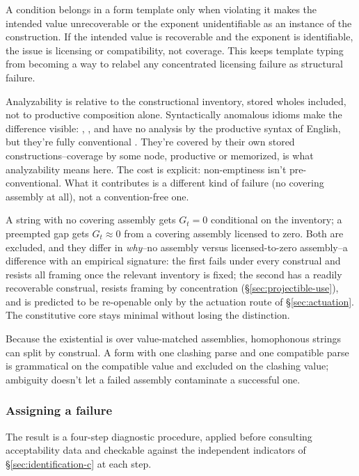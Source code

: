 A condition belongs in a form template only when violating it makes the intended
value unrecoverable or the exponent unidentifiable as an instance of the
construction. If the intended value is recoverable and the exponent is
identifiable, the issue is licensing or compatibility, not coverage. This keeps
template typing from becoming a way to relabel any concentrated licensing
failure as structural failure.

Analyzability is relative to the constructional inventory, stored wholes included, not to productive composition alone. Syntactically anomalous idioms make the difference visible: , , and  have no analysis by the productive syntax of English, but they're fully conventional \citep{fillmore1988}. They're covered by their own stored constructions--coverage by some node, productive or memorized, is what analyzability means here. The cost is explicit: non-emptiness isn't pre-conventional. What it contributes is a different kind of failure (no covering assembly at all), not a convention-free one.

A string with no covering assembly gets $G_t=0$ conditional on the inventory;
a preempted gap gets $G_t\approx0$ from a
covering assembly licensed to zero. Both are excluded, and they differ in
\emph{why}--no assembly versus licensed-to-zero assembly--a difference with an
empirical signature: the first fails under every construal and resists all
framing once the relevant inventory is fixed; the second has a readily recoverable
construal, resists framing by concentration (\S\ref{sec:projectible-use}), and
is predicted to be re-openable only by the actuation route of
\S\ref{sec:actuation}. The constitutive core stays minimal without losing the
distinction.

Because the existential is over value-matched assemblies, homophonous strings can split by construal. A form with one clashing parse and one compatible parse is grammatical on the compatible value and excluded on the clashing value; ambiguity doesn't let a failed assembly contaminate a successful one.

\subsubsection{Assigning a failure}
\label{sec:assigning-failure}
\label{sec:failure-assignment}

The result is a four-step diagnostic procedure, applied before consulting acceptability data and checkable against the independent indicators of \S\ref{sec:identification-c} at each step.

